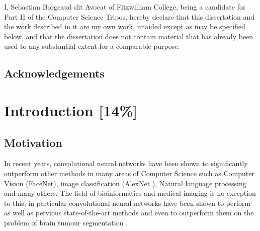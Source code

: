 \documentclass[12pt,a4paper,twoside,openright]{report}
\begin{document}
I, Sebastian Borgeaud dit Avocat of Fitzwilliam College, being a candidate for Part II of the Computer Science Tripos, hereby declare
that this dissertation and the work described in it are my own work,
unaided except as may be specified below, and that the dissertation
does not contain material that has already been used to any substantial
extent for a comparable purpose.

\bigskip
{}

\medskip
{}

\tableofcontents

\listoffigures

\newpage

\setlength{\parskip}{1em} %

\section*{Acknowledgements}



\pagestyle{headings}

\chapter{Introduction [14\%]}
\section{Motivation}
In recent years, convolutional neural networks have been shown to significantly outperform other methods in many areas of Computer Science such as Computer Vision (FaceNet\cite{face_net}), image classification (AlexNet \cite{alex_net}), Natural language processing \cite{nlp_deep_learning} and many others. The field of bioinformatics and medical imaging is no exception to this, in particular convolutional neural networks have been shown to perform as well as pervious state-of-the-art methods and even to outperform them on the problem of brain tumour segmentation \cite{pereira} \cite{brats_cnn_with_crf}.
\end{document}
